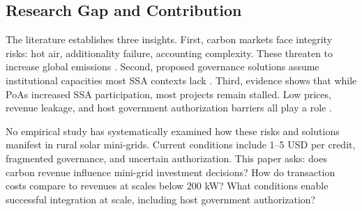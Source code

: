 \subsection{Research Gap and Contribution}
\label{subsec:lit-gap}
The literature establishes three insights. First, carbon markets face integrity risks: hot air, additionality failure, accounting complexity. These threaten to increase global emissions \cite{schneider-integrity,theuer-transfers,siemons-accounting}. Second, proposed governance solutions assume institutional capacities most SSA contexts lack \cite{michaelowa-towards,michaelowa-catalysing}. Third, evidence shows that while PoAs increased SSA participation, most projects remain stalled. Low prices, revenue leakage, and host government authorization barriers all play a role \cite{michaelowa-mobilising,power-africa-credits,koko-disrupt}.

No empirical study has systematically examined how these risks and solutions manifest in rural solar mini-grids. Current conditions include 1–5 USD per credit, fragmented governance, and uncertain authorization. This paper asks: does carbon revenue influence mini-grid investment decisions? How do transaction costs compare to revenues at scales below 200 kW? What conditions enable successful integration at scale, including host government authorization?